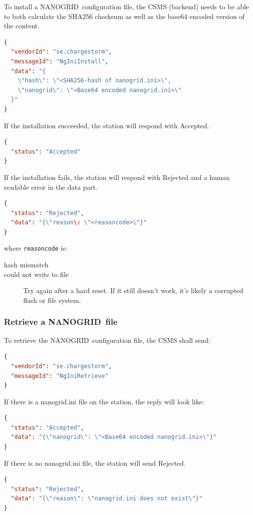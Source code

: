 \documentclass{scrartcl}
\newcommand{\nanogrid}{NANOGRID\texttrademark}
\begin{document}
To install a \nanogrid\ configuration file, the CSMS (backend) needs to be able to
both calculate the SHA256 checksum as well as the base64 encoded version of the
content.

\begin{lstlisting}[language=json,caption={DataTransfer.req for NgIniInstall
sent to the CS},captionpos=t]
{
  "vendorId": "se.chargestorm",
  "messageId": "NgIniInstall",
  "data": "{
    \"hash\": \"<SHA256-hash of nanogrid.ini>\",
    \"nanogrid\": \"<Base64 encoded nanogrid.ini>\"
  }"
}
\end{lstlisting}

If the installation succeeded, the station will respond with Accepted.
\begin{lstlisting}[language=json,caption={DataTransfer.conf for NgIniInstall
sent from the CS},captionpos=t]
{
  "status": "Accepted"
}
\end{lstlisting}
If the installation fails, the station will respond with Rejected and a
human readable error in the data part.
\begin{lstlisting}[language=json,caption={DataTransfer.conf for NgIniInstall
sent from the CS},captionpos=t]
{
  "status": "Rejected",
  "data": "{\"reason\: \"<reasoncode>\"}"
}
\end{lstlisting}
where \verb|reasoncode| is:
\begin{description}
\item[hash mismatch]
\item[could not write  to file] Try again after a hard reset. If it still
  doesn't work, it's likely a corrupted flash or file system.
\end{description}



\subsubsection{Retrieve a \nanogrid\ file}
\label{sec:retr-nanogr-file}

To retrieve the \nanogrid\ configuration file, the CSMS shall send:

\begin{lstlisting}[language=json,caption={DataTransfer.req for NgIniRetrieve
sent to the CS},captionpos=t]
{
  "vendorId": "se.chargestorm",
  "messageId": "NgIniRetrieve"
}
\end{lstlisting}
If there is a nanogrid.ini file on the station, the reply will look like:
\begin{lstlisting}[language=json,caption={DataTransfer.conf for NgIniRetrieve
sent from the CS},captionpos=t]
{
  "status": "Accepted",
  "data": "{\"nanogrid\": \"<Base64 encoded nanogrid.ini>\"}"
}
\end{lstlisting}
If there is no nanogrid.ini file, the station will send Rejected.
\begin{lstlisting}[language=json,caption={DataTransfer.conf for NgIniRetrieve
sent from the CS},captionpos=t]
{
  "status": "Rejected",
  "data": "{\"reason\": \"nanogrid.ini does not exist\"}"
}
\end{lstlisting}
\end{document}
